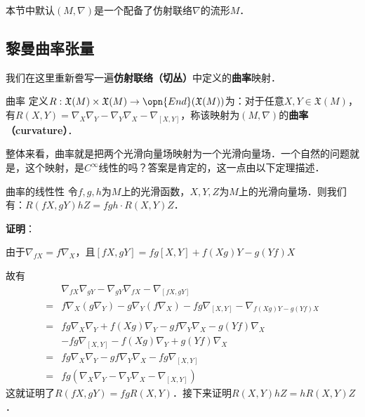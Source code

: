 

本节中默认$(M, \nabla)$是一个配备了仿射联络$\nabla$的流形$M$．

\subsection{黎曼曲率张量}

我们在这里重新誊写一遍\textbf{仿射联络（切丛）}中定义的\textbf{曲率}映射．

\begin{definition}{曲率}
定义$R:\mathfrak{X}(M)\times\mathfrak{X}(M)\to\opn{End}(\mathfrak{X}(M))$为：对于任意$X, Y\in\mathfrak{X}(M)$，有$R(X, Y)=\nabla_X\nabla_Y-\nabla_Y\nabla_X-\nabla_{[X, Y]}$，称该映射为$(M, \nabla)$的\textbf{曲率（curvature）}．
\end{definition}

整体来看，曲率就是把两个光滑向量场映射为一个光滑向量场．一个自然的问题就是，这个映射，是$C^{\infty}$线性的吗？答案是肯定的，这一点由以下定理描述．

\begin{theorem}{曲率的线性性}\label{RicciC_the1}
令$f, g, h$为$M$上的光滑函数，$X, Y, Z$为$M$上的光滑向量场．则我们有：$R(fX, gY)hZ=fgh\cdot R(X, Y)Z$．
\end{theorem}

\textbf{证明}：

由于$\nabla_{fX}=f\nabla_X$，且$[fX, gY]=fg[X, Y]+f(Xg)Y-g(Yf)X$

故有
\begin{equation}
\begin{aligned}
&\nabla_{fX}\nabla_{gY}-\nabla_{gY}\nabla_{fX}-\nabla_{[fX, gY]}\\=&f\nabla_X(g\nabla_Y)-g\nabla_Y(f\nabla_X)-fg\nabla_{[X, Y]}-\nabla_{f(Xg)Y-g(Yf)X}\\
\\=&fg\nabla_X\nabla_Y+f(Xg)\nabla_Y-gf\nabla_Y\nabla_X-g(Yf)\nabla_X\\&-fg\nabla_{[X, Y]}-f(Xg)\nabla_Y+g(Yf)\nabla_X\\
=&fg\nabla_X\nabla_Y-gf\nabla_Y\nabla_X-fg\nabla_{[X, Y]}\\
=&fg(\nabla_X\nabla_Y-\nabla_Y\nabla_X-\nabla_{[X, Y]})
\end{aligned}
\end{equation}
这就证明了$R(fX, gY)=fgR(X, Y)$．接下来证明$R(X, Y)hZ=hR(X, Y)Z$．

